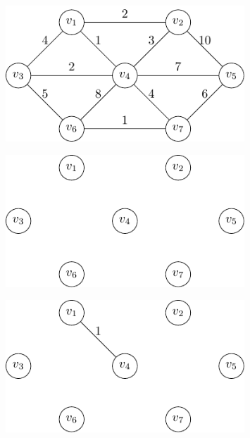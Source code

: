\begin{minipage}{0.25\textwidth}
\begin{figure}[H]
  \centering
  \includegraphics[width=0.8\textwidth]{Figure/min_span.pdf}
\end{figure}
\end{minipage}
\begin{minipage}{0.25\textwidth}
\begin{figure}[H]
  \centering
  \includegraphics[width=0.8\textwidth]{Figure/Kruskal_algo_d1.pdf}
\end{figure}
\end{minipage}
\begin{minipage}{0.25\textwidth}
\begin{figure}[H]
  \centering
  \includegraphics[width=0.8\textwidth]{Figure/Kruskal_algo_d2.pdf}
\end{figure}
\end{minipage}
